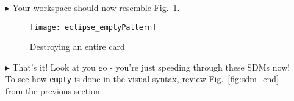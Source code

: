 \begin{itemize}
\vspace{0.5cm}

\item[$\blacktriangleright$] Your workspace should now resemble Fig.~\ref{fig:emptyPattern}.

\vspace{0.5cm}

\begin{figure}[htpb]
\begin{center}
  \texttt{[image: eclipse\_emptyPattern]}
  \caption{Destroying an entire card}
  \label{fig:emptyPattern}
\end{center}
\end{figure}

\item[$\blacktriangleright$] That's it! Look at you go - you're just speeding through these SDMs now! To see how \texttt{empty} is done in the visual syntax,
review Fig.~\ref{fig:sdm_end} from the previous section.

\end{itemize}
